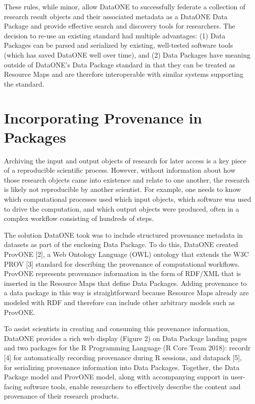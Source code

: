 \documentclass[conference]{IEEEtran}
\begin{document}
These rules, while minor, allow DataONE to successfully federate a collection of research result objects and their associated metadata as a DataONE Data Package and provide effective search and discovery tools for researchers.
The decision to re-use an existing standard had multiple advantages: (1) Data Packages can be parsed and serialized by existing, well-tested software tools (which has saved DataONE well over time), and (2) Data Packages have meaning outside of DataONE’s Data Package standard in that they can be treated as Resource Maps and are therefore interoperable with similar systems supporting the standard.

\section{Incorporating Provenance in Packages}

Archiving the input and output objects of research for later access is a key piece of a reproducible scientific process.
However, without information about how those research objects came into existence and relate to one another, the research is likely not reproducible by another scientist.
For example, one needs to know which computational processes used which input objects, which software was used to drive the computation, and which output objects were produced, often in a complex workflow consisting of hundreds of steps.


The solution DataONE took was to include structured provenance metadata in datasets as part of the enclosing Data Package.
To do this, DataONE created ProvONE [2], a Web Ontology Language (OWL) ontology that extends the W3C PROV [3] standard for describing the provenance of computational workflows.
ProvONE represents provenance information in the form of RDF/XML that is inserted in the Resource Maps that define Data Packages.
Adding provenance to a data package in this way is straightforward because Resource Maps already are modeled with RDF and therefore can include other arbitrary models such as ProvONE.

To assist scientists in creating and consuming this provenance information, DataONE provides a rich web display (Figure 2) on Data Package landing pages and two packages for the R Programming Language (R Core Team 2018): recordr [4] for automatically recording provenance during R sessions, and datapack [5], for serializing provenance information into Data Packages.
Together, the Data Package model and ProvONE model, along with accompanying support in user-facing software tools, enable researchers to effectively describe the content and provenance of their research products.
\end{document}
